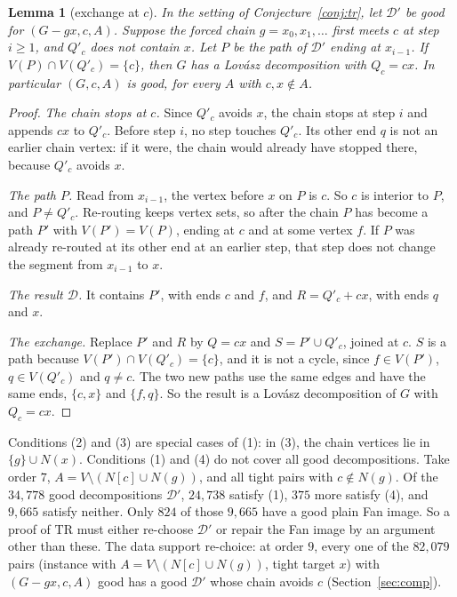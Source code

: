 \documentclass[11pt]{amsart}
\newtheorem{lemma}[theorem]{Lemma}
\theoremstyle{definition}
\newcommand{\cD}{\mathcal D}
\newcommand{\TR}{\mathrm{TR}}
\begin{document}
\begin{lemma}[exchange at $c$]\label{lem:exchange}
In the setting of Conjecture~\ref{conj:tr}, let $\cD'$ be good for $(G-gx,c,A)$. Suppose the forced
chain $g=x_0,x_1,\dots$ first meets $c$ at step $i\ge1$, and $Q'_c$ does not contain $x$. Let $P$ be
the path of $\cD'$ ending at $x_{i-1}$. If $V(P)\cap V(Q'_c)=\{c\}$, then $G$ has a Lov\'asz
decomposition with $Q_c=cx$. In particular $(G,c,A)$ is good, for every $A$ with $c,x\notin A$.
\end{lemma}

\begin{proof}
\emph{The chain stops at $c$.} Since $Q'_c$ avoids $x$, the chain stops at step $i$ and appends $cx$
to $Q'_c$. Before step $i$, no step touches $Q'_c$. Its other end $q$ is not an earlier chain vertex:
if it were, the chain would already have stopped there, because $Q'_c$ avoids $x$.

\emph{The path $P$.} Read from $x_{i-1}$, the vertex before $x$ on $P$ is $c$. So $c$ is interior to
$P$, and $P\ne Q'_c$. Re-routing keeps vertex sets, so after the chain $P$ has become a path $P'$
with $V(P')=V(P)$, ending at $c$ and at some vertex $f$. If $P$ was already re-routed at its other
end at an earlier step, that step does not change the segment from $x_{i-1}$ to $x$.

\emph{The result $\cD$.} It contains $P'$, with ends $c$ and $f$, and $R=Q'_c+cx$, with ends $q$ and
$x$.

\emph{The exchange.} Replace $P'$ and $R$ by $Q=cx$ and $S=P'\cup Q'_c$, joined at $c$. $S$ is a path
because $V(P')\cap V(Q'_c)=\{c\}$, and it is not a cycle, since $f\in V(P')$, $q\in V(Q'_c)$ and
$q\ne c$. The two new paths use the same edges and have the same ends, $\{c,x\}$ and $\{f,q\}$. So
the result is a Lov\'asz decomposition of $G$ with $Q_c=cx$.
\end{proof}

Conditions (2) and (3) are special cases of (1): in (3), the chain vertices lie in $\{g\}\cup N(x)$.
Conditions (1) and (4) do not cover all good decompositions. Take order $7$, $A=V\setminus(N[c]\cup
N(g))$, and all tight pairs with $c\notin N(g)$. Of the $34{,}778$ good decompositions $\cD'$,
$24{,}738$ satisfy (1), $375$ more satisfy (4), and $9{,}665$ satisfy neither. Only $824$ of those
$9{,}665$ have a good plain Fan image. So a proof of $\TR$ must either re-choose $\cD'$ or repair
the Fan image by an argument other than these. The data support re-choice: at order $9$, every one of
the $82{,}079$ pairs (instance with $A=V\setminus(N[c]\cup N(g))$, tight target $x$) with $(G-gx,c,A)$
good has a good $\cD'$ whose chain avoids $c$ (Section~\ref{sec:comp}).
\end{document}
